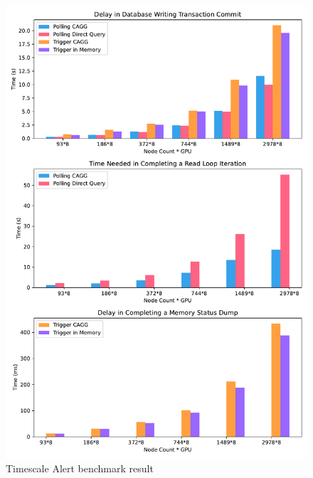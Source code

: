 




\begin{figure}[H]
    \centering
    \includegraphics[width=1\textwidth]{figures/benchmark-data.pdf}
    \caption{Timescale Alert benchmark result}
    \label{fig_benchmark}
\end{figure}

